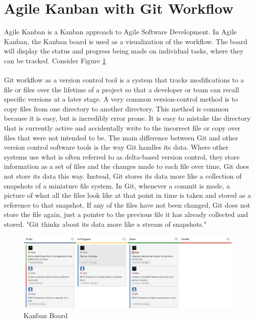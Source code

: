 \section{Agile Kanban with Git Workflow}
Agile Kanban is a Kanban approach to Agile Software Development. In Agile Kanban, the Kanban board is used as a visualization of the workflow. The board will display the status and progress being made on individual tasks, where they can be tracked. Consider Figure \ref{fig:kanban}

\paragraph{}
Git workflow as a version control tool is a system that tracks modifications to a file or files over the lifetime of a project so that a developer or team can recall specific versions at a later stage. A very common version-control method is to copy files from one directory to another directory. This method is common because it is easy, but is incredibly error prone. It is easy to mistake the directory that is currently active and accidentally write to the incorrect file or copy over files that were not intended to be.\cite{chachon} The main difference between Git and other version control software tools is the way Git handles its data. Where other systems use what is often referred to as delta-based version control, they store information as a set of files and the changes made to each file over time, Git does not  store its data this way. Instead, Git stores its data more like a collection of snapshots of a miniature file system. In Git, whenever a commit is made, a picture of what all the files look like at that point in time is taken and stored as a reference to that snapshot.\cite{chachon} If any of the files have not been changed, Git does not store the file again, just a pointer to the previous file it has already collected and stored. "Git thinks about its data more like a stream of snapshots."\cite{chachon}



\begin{figure}
\includegraphics[width=\textwidth]{img/Kanban.PNG}
\caption{Kanban Board}
\label{fig:kanban}
\end{figure}

